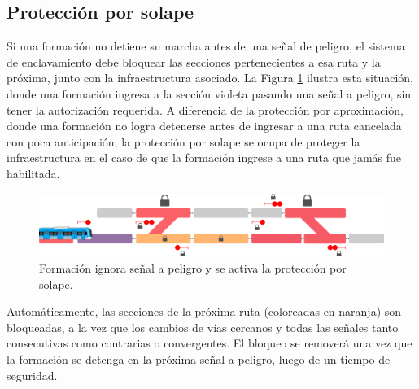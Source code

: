 \subsection{Protección por solape}

	\label{sec:function_4}
	
	Si una formación no detiene su marcha antes de una señal de peligro, el sistema de enclavamiento debe bloquear las secciones pertenecientes a esa ruta y la próxima, junto con la infraestructura asociado. La Figura \ref{fig:ACG_solape_1} ilustra esta situación, donde una formación ingresa a la sección violeta pasando una señal a peligro, sin tener la autorización requerida. A diferencia de la protección por aproximación, donde una formación no logra detenerse antes de ingresar a una ruta cancelada con poca anticipación, la protección por solape se ocupa de proteger la infraestructura en el caso de que la formación ingrese a una ruta que jamás fue habilitada.

    \begin{figure}[!h]
        \centering
        \includegraphics[width=1\textwidth]{Figuras/solape}
        \centering\caption{Formación ignora señal a peligro y se activa la protección por solape.}
        \label{fig:ACG_solape_1}
    \end{figure}
    
    Automáticamente, las secciones de la próxima ruta (coloreadas en naranja) son bloqueadas, a la vez que los cambios de vías cercanos y todas las señales tanto consecutivas como contrarias o convergentes. El bloqueo se removerá una vez que la formación se detenga en la próxima señal a peligro, luego de un tiempo de seguridad.